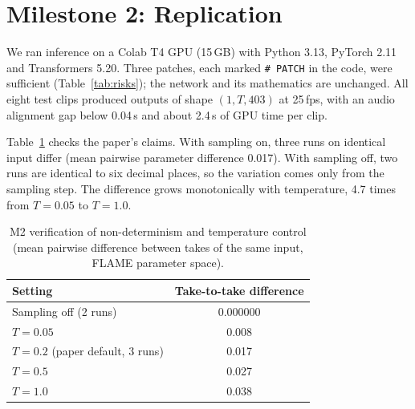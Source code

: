 \documentclass[10pt,twocolumn,letterpaper]{article}
\begin{document}
\section{Milestone 2: Replication}
\label{sec:m2}
We ran inference on a Colab T4 GPU (15\,GB) with Python 3.13, PyTorch 2.11 and Transformers 5.20. Three patches, each marked \texttt{\# PATCH} in the code, were sufficient (Table~\ref{tab:risks}); the network and its mathematics are unchanged. All eight test clips produced outputs of shape $(1,T,403)$ at 25\,fps, with an audio alignment gap below 0.04\,s and about 2.4\,s of GPU time per clip.

Table~\ref{tab:m2} checks the paper's claims. With sampling on, three runs on identical input differ (mean pairwise parameter difference 0.017). With sampling off, two runs are identical to six decimal places, so the variation comes only from the sampling step. The difference grows monotonically with temperature, 4.7 times from $T{=}0.05$ to $T{=}1.0$.

\begin{table}[t]
\centering\small
\caption{M2 verification of non-determinism and temperature control (mean pairwise difference between takes of the same input, FLAME parameter space).}
\label{tab:m2}
\begin{tabular}{@{}lc@{}}
\toprule
Setting & Take-to-take difference\\
\midrule
Sampling off (2 runs) & 0.000000\\
$T=0.05$ & 0.008\\
$T=0.2$ (paper default, 3 runs) & 0.017\\
$T=0.5$ & 0.027\\
$T=1.0$ & 0.038\\
\bottomrule
\end{tabular}
\end{table}
\end{document}
